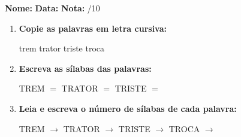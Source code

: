 \begin{exercicio}



\noindent\textbf{Nome:} \underline{\hspace{3.2cm}} \quad \textbf{Data:} \underline{\hspace{1.6cm}} \quad \textbf{Nota:} \underline{\hspace{0.9cm}}/10


\begin{enumerate}

  \item \textbf{Copie as palavras em letra cursiva:}
  \begin{center}
  trem \quad trator \quad triste \quad troca
  \end{center}
  \begin{center}
  \underline{\hspace{2.4cm}} \quad \underline{\hspace{2.4cm}} \quad \underline{\hspace{2.4cm}} \quad \underline{\hspace{2.4cm}}
  \end{center}

  \item \textbf{Escreva as sílabas das palavras:}
  \begin{center}
  TREM $=$ \underline{\hspace{1.5cm}} \underline{\hspace{1.5cm}} \quad TRATOR $=$ \underline{\hspace{1.5cm}} \underline{\hspace{1.5cm}} \quad TRISTE $=$ \underline{\hspace{1.5cm}} \underline{\hspace{1.5cm}}
  \end{center}

  \item \textbf{Leia e escreva o número de sílabas de cada palavra:}
  \begin{center}
  TREM $\rightarrow$ \underline{\hspace{0.9cm}} \quad TRATOR $\rightarrow$ \underline{\hspace{0.9cm}} \quad TRISTE $\rightarrow$ \underline{\hspace{0.9cm}} \quad TROCA $\rightarrow$ \underline{\hspace{0.9cm}}
  \end{center}


\end{enumerate}
\end{exercicio}
